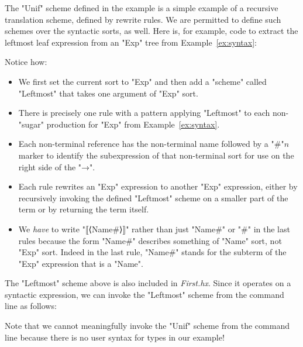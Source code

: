 \documentclass[11pt]{article} %
\begin{document}
\begin{example}\label{ex:leftmost}
  The "Unif" scheme defined in the example is a simple example of a recursive translation scheme,
  defined by rewrite rules.  We are permitted to define such schemes over the syntactic sorts, as
  well.  Here is, for example, code to extract the leftmost leaf expression from an "Exp" tree from
  Example~\ref{ex:syntax}:
  Notice how:
  \begin{itemize}

  \item We first set the current sort to "Exp" and then add a "scheme" called "Leftmost" that takes
    one argument of "Exp" sort.

  \item There is precisely one rule with a pattern applying "Leftmost" to each non-"sugar"
    production for "Exp" from Example~\ref{ex:syntax}.

  \item Each non-terminal reference has the non-terminal name followed by a "#"$n$ marker to
    identify the subexpression of that non-terminal sort for use on the right side of the "→".

  \item Each rule rewrites an "Exp" expression to another "Exp" expression, either by recursively
    invoking the defined "Leftmost" scheme on a smaller part of the term or by returning the term
    itself.

  \item We \emph{have} to write "⟦⟨Name#⟩⟧" rather than just "Name#" or "#" in the last rules
    because the form "Name#" describes something of "Name" sort, not "Exp" sort.  Indeed in the last
    rule, "Name#" stands for the subterm of the "Exp" expression that is a "Name".

  \end{itemize}
\end{example}

\begin{commands}
  The "Leftmost" scheme above is also included in \emph{First.hx}.  Since it operates on a syntactic
  expression, we can invoke the "Leftmost" scheme from the command line as follows:


  Note that we cannot meaningfully invoke the "Unif" scheme from the command line because there is
  no user syntax for types in our example!
\end{commands}
\end{document}
